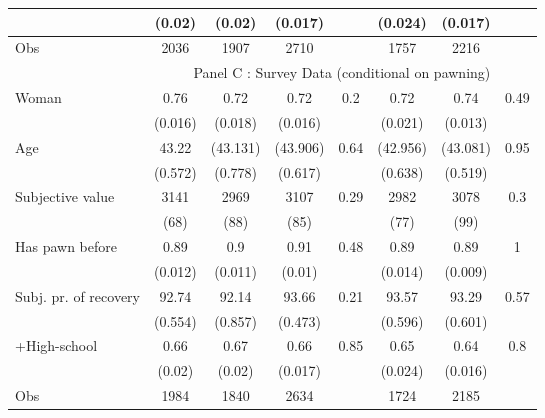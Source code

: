 \begin{tabular}{lccccccc}
      & (0.02) & (0.02) & (0.017) &       & (0.024) & (0.017) &  \\
\midrule
Obs   & 2036  & 1907  & 2710  &       & 1757  & 2216  &  \\
\midrule
      & \multicolumn{7}{c}{Panel C : Survey Data (conditional on pawning)} \\
Woman & 0.76  & 0.72  & 0.72  & 0.2   & 0.72  & 0.74  & 0.49 \\
      & (0.016) & (0.018) & (0.016) &       & (0.021) & (0.013) &  \\
Age   & 43.22 & (43.131) & (43.906) & 0.64  & (42.956) & (43.081) & 0.95 \\
      & (0.572) & (0.778) & (0.617) &       & (0.638) & (0.519) &  \\
Subjective value & 3141  & 2969  & 3107  & 0.29  & 2982  & 3078  & 0.3 \\
      & (68)  & (88)  & (85)  &       & (77)  & (99)  &  \\
Has pawn before & 0.89  & 0.9   & 0.91  & 0.48  & 0.89  & 0.89  & 1 \\
      & (0.012) & (0.011) & (0.01) &       & (0.014) & (0.009) &  \\
Subj. pr. of recovery & 92.74 & 92.14 & 93.66 & 0.21  & 93.57 & 93.29 & 0.57 \\
      & (0.554) & (0.857) & (0.473) &       & (0.596) & (0.601) &  \\
+High-school & 0.66  & 0.67  & 0.66  & 0.85  & 0.65  & 0.64  & 0.8 \\
      & (0.02) & (0.02) & (0.017) &       & (0.024) & (0.016) &  \\
\midrule
Obs   & 1984  & 1840  & 2634  &       & 1724  & 2185  &  \\
\bottomrule
\bottomrule
\end{tabular}%
